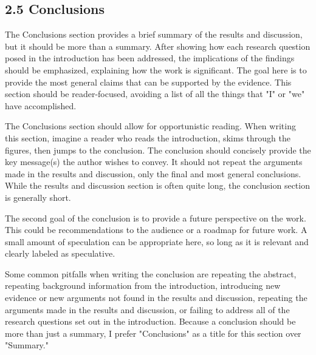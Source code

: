 \subsection*{2.5 Conclusions}
The Conclusions section provides a brief summary of the results and discussion, but it should be more than a summary. After showing how each research question posed in the introduction has been addressed, the implications of the findings should be emphasized, explaining how the work is significant. The goal here is to provide the most general claims that can be supported by the evidence. This section should be reader-focused, avoiding a list of all the things that "I" or "we" have accomplished.

The Conclusions section should allow for opportunistic reading. When writing this section, imagine a reader who reads the introduction, skims through the figures, then jumps to the conclusion. The conclusion should concisely provide the key message(s) the author wishes to convey. It should not repeat the arguments made in the results and discussion, only the final and most general conclusions. While the results and discussion section is often quite long, the conclusion section is generally short.

The second goal of the conclusion is to provide a future perspective on the work. This could be recommendations to the audience or a roadmap for future work. A small amount of speculation can be appropriate here, so long as it is relevant and clearly labeled as speculative.

Some common pitfalls when writing the conclusion are repeating the abstract, repeating background information from the introduction, introducing new evidence or new arguments not found in the results and discussion, repeating the arguments made in the results and discussion, or failing to address all of the research questions set out in the introduction. Because a conclusion should be more than just a summary, I prefer "Conclusions" as a title for this section over "Summary."

